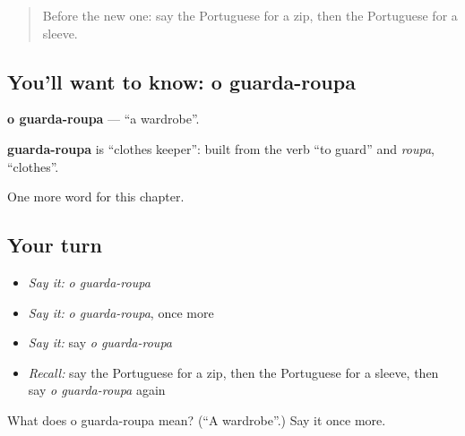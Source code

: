 \begin{quote}
Before the new one: say the Portuguese for a zip, then the Portuguese for a sleeve.
\end{quote}

\subsection*{You'll want to know: o guarda-roupa}
\textbf{o guarda-roupa} — \textquotedblleft{}a wardrobe\textquotedblright{}.

\begin{cousinweb}
\textbf{guarda-roupa} is \textquotedblleft{}clothes keeper\textquotedblright{}: built from the verb \textquotedblleft{}to guard\textquotedblright{} and \emph{roupa}, \textquotedblleft{}clothes\textquotedblright{}.
\end{cousinweb}

\begin{grammarlens}[title={What you've built}]
One more word for this chapter.
\end{grammarlens}

\subsection*{Your turn}
\begin{itemize}
\raggedright
  \item \emph{Say it:} \emph{o guarda-roupa}
  \item \emph{Say it:} \emph{o guarda-roupa}, once more
  \item \emph{Say it:} say \emph{o guarda-roupa}
  \item \emph{Recall:} say the Portuguese for a zip, then the Portuguese for a sleeve, then say \emph{o guarda-roupa} again
\end{itemize}

\begin{tcolorbox}[breakable,colback=teal!4,colframe=teal!35!black,title={Before you move on}]
What does o guarda-roupa mean? (\textquotedblleft{}A wardrobe\textquotedblright{}.) Say it once more.
\end{tcolorbox}
